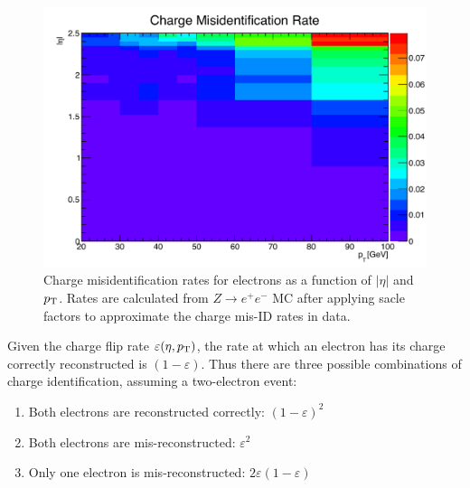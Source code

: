 \begin{figure}
  \centering
  \includegraphics[width=.7\textwidth]{figs/ssww_13tev/backgrounds/charge_flip/charge_flip_2d}
  \caption{Charge misidentification rates for electrons as a function of $|\eta|$ and $p_{\mathrm{T}}$.  Rates are calculated from $Z\rightarrow e^{+}e^{-}$ MC after applying sacle factors to approximate the charge mis-ID rates in data.}
  \label{fig:charge_flip_rates}
\end{figure}

Given the charge flip rate $\varepsilon(\eta,\pt)$, the rate at which an electron has its charge correctly reconstructed is $(1-\varepsilon)$.
Thus there are three possible combinations of charge identification, assuming a two-electron event:
\begin{enumerate}
\item Both electrons are reconstructed correctly: $(1-\varepsilon)^2$
\item Both electrons are mis-reconstructed: $\varepsilon^2$
\item Only one electron is mis-reconstructed: $2\varepsilon(1-\varepsilon)$
\end{enumerate}

